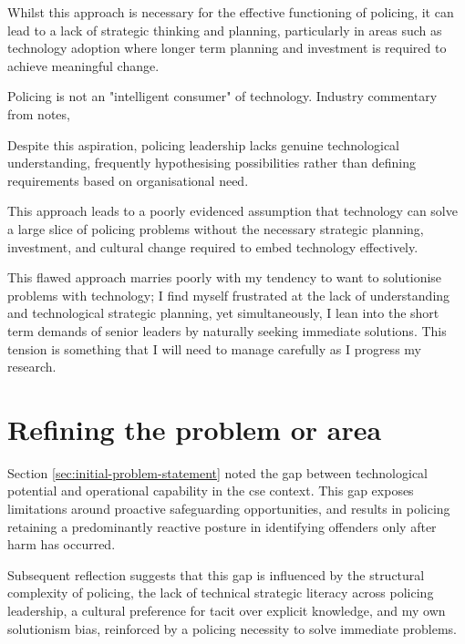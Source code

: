 \documentclass[12pt,a4paper,oneside]{report}
\begin{document}
Whilst this approach is necessary for the effective functioning of policing, it can lead to a lack of strategic thinking and planning, particularly in areas such as technology adoption where longer term planning and investment is required to achieve meaningful change.

Policing is not an "intelligent consumer" of technology. Industry commentary from \citet{pds2020strategy} notes,


Despite this aspiration, policing leadership lacks genuine technological understanding, frequently hypothesising possibilities rather than defining requirements based on organisational need.  

This approach leads to a poorly evidenced assumption that technology can solve a large slice of policing problems without the necessary strategic planning, investment, and cultural change required to embed technology effectively.

This flawed approach marries poorly with my tendency to want to solutionise problems with technology; I find myself frustrated at the lack of understanding and technological strategic planning, yet simultaneously, I lean into the short term demands of senior leaders by naturally seeking immediate solutions.  This tension is something that I will need to manage carefully as I progress my research.

\section{Refining the problem or area} 
\label{sec:refining-the-problem-or-area}
Section \ref{sec:initial-problem-statement} noted the gap between technological potential and operational capability in the \gls{cse} context.  This gap exposes limitations around proactive safeguarding opportunities, and results in policing retaining a predominantly reactive posture in identifying offenders only after harm has occurred.

Subsequent reflection suggests that this gap is influenced by the structural complexity of policing, the lack of technical strategic literacy across policing leadership, a cultural preference for tacit over explicit knowledge, and my own solutionism bias, reinforced by a policing necessity to solve immediate problems.
\end{document}
